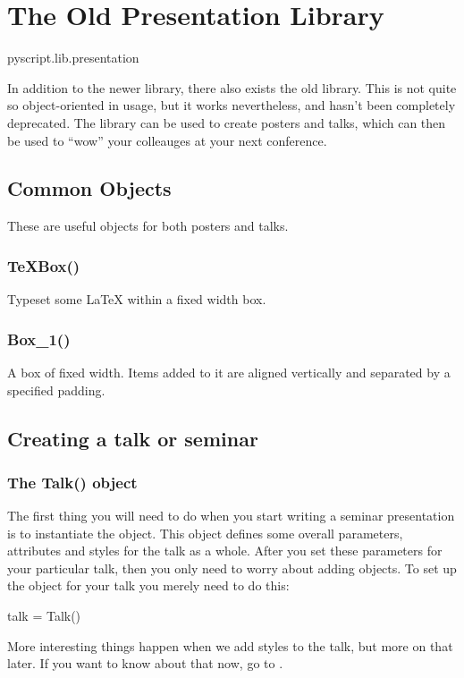 
\chapter{The Old Presentation Library}

\begin{python}
pyscript.lib.presentation
\end{python}

In addition to the newer  library, there also
exists the old  library.  This is not quite
so object-oriented in usage, but it works nevertheless, and hasn't been
completely deprecated.  The  library can be used to create
posters and talks, which can then be used to ``wow'' your colleauges at your
next conference.

\section{Common Objects}

These are useful objects for both posters and talks.

\subsection{TeXBox()}

Typeset some \LaTeX{} within a fixed width box.

\subsection{Box\_1()}

A box of fixed width.  Items added to it are aligned vertically and
separated by a specified padding.

\section{Creating a talk or seminar}

\subsection{The Talk() object}

The first thing you will need to do when you start writing a seminar
presentation is to instantiate the  object.  This object defines
some overall parameters, attributes and styles for the talk as a whole.
After you set these parameters for your particular talk, then you only need
to worry about adding  objects.  To set up the 
object for your talk you merely need to do this:
\begin{python}
talk = Talk()
\end{python}
More interesting things happen when we add styles to the talk, but more on
that later.  If you want to know about that now, go to .

